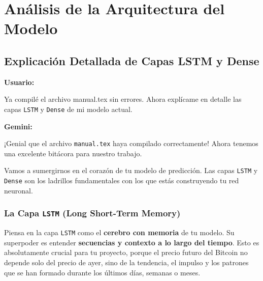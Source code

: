 \documentclass[12pt, a4paper]{article}
\newenvironment{usuario}{\par\noindent\textbf{Usuario:}\itshape\par\ignorespaces}{\par}
\newenvironment{gemini}{\par\noindent\textbf{Gemini:}\par\ignorespaces}{\par}
\begin{document}
\section{Análisis de la Arquitectura del Modelo}

\subsection{Explicación Detallada de Capas LSTM y Dense}

\begin{usuario}Ya compilé el archivo manual.tex sin errores. 
Ahora explícame en detalle las capas \texttt{LSTM} y 
\texttt{Dense} de mi modelo actual.
\end{usuario}

\begin{gemini}
    ¡Genial que el archivo \texttt{manual.tex} haya compilado 
    correctamente! Ahora tenemos una excelente bitácora para 
    nuestro trabajo.

Vamos a sumergirnos en el corazón de tu modelo de predicción. 
Las capas \texttt{LSTM} y \texttt{Dense} son los ladrillos 
fundamentales con los que estás construyendo tu red neuronal.

\subsubsection{La Capa \texttt{LSTM} (Long Short-Term Memory)}

Piensa en la capa \texttt{LSTM} como el \textbf{cerebro con memoria} de tu modelo. Su 
superpoder es entender \textbf{secuencias y contexto a lo largo del tiempo}. Esto es 
absolutamente crucial para tu proyecto, porque el precio futuro del Bitcoin no depende 
solo del precio de ayer, sino de la tendencia, el impulso y los patrones que se han 
formado durante los últimos días, semanas o meses.


\end{gemini}
\end{document}
